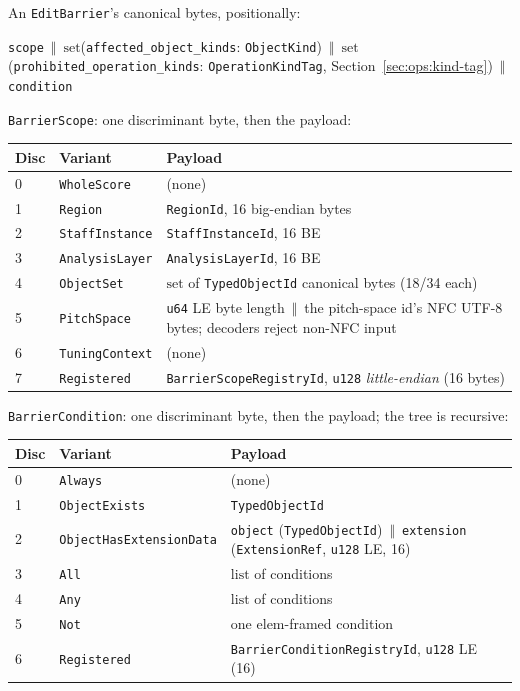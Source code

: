 \documentclass[11pt,letterpaper]{report}
\newcommand{\tablenums}[1]{{\addfontfeatures{Numbers={Lining,Tabular}}#1}}
\newcommand{\cat}{\ensuremath{\,\Vert\,}}
\begin{document}
An \texttt{EditBarrier}'s canonical bytes, positionally:

\begin{center}
\texttt{scope} \cat{} $\mathrm{set}$(\texttt{affected\_object\_kinds}:
\texttt{ObjectKind}) \cat{}
$\mathrm{set}$(\texttt{prohibited\_operation\_kinds}:
\texttt{OperationKindTag}, Section~\ref{sec:ops:kind-tag}) \cat{}
\texttt{condition}
\end{center}

\texttt{BarrierScope}: one discriminant byte, then the payload:

\begingroup\small
\begin{longtable}{p{0.35in} p{1.35in} p{3.8in}}
  \toprule
  \textbf{Disc} & \textbf{Variant} & \textbf{Payload} \\
  \midrule
  \endhead
  \tablenums{0} & \texttt{WholeScore} & (none) \\
  \tablenums{1} & \texttt{Region} & \texttt{RegionId}, 16 big-endian bytes \\
  \tablenums{2} & \texttt{StaffInstance} & \texttt{StaffInstanceId}, 16 BE \\
  \tablenums{3} & \texttt{AnalysisLayer} & \texttt{AnalysisLayerId}, 16 BE \\
  \tablenums{4} & \texttt{ObjectSet} & $\mathrm{set}$ of
    \texttt{TypedObjectId} canonical bytes (18/34 each) \\
  \tablenums{5} & \texttt{PitchSpace} & \texttt{u64} LE byte length \cat{}
    the pitch-space id's NFC UTF-8 bytes; decoders reject non-NFC input \\
  \tablenums{6} & \texttt{TuningContext} & (none) \\
  \tablenums{7} & \texttt{Registered} & \texttt{BarrierScopeRegistryId},
    \texttt{u128} \emph{little-endian} (16 bytes) \\
  \bottomrule
\end{longtable}
\endgroup

\texttt{BarrierCondition}: one discriminant byte, then the payload; the tree
is recursive:

\begingroup\small
\begin{longtable}{p{0.35in} p{1.85in} p{3.3in}}
  \toprule
  \textbf{Disc} & \textbf{Variant} & \textbf{Payload} \\
  \midrule
  \endhead
  \tablenums{0} & \texttt{Always} & (none) \\
  \tablenums{1} & \texttt{ObjectExists} & \texttt{TypedObjectId} \\
  \tablenums{2} & \texttt{ObjectHasExtensionData} & \texttt{object}
    (\texttt{TypedObjectId}) \cat{} \texttt{extension}
    (\texttt{ExtensionRef}, \texttt{u128} LE, 16) \\
  \tablenums{3} & \texttt{All} & $\mathrm{list}$ of conditions \\
  \tablenums{4} & \texttt{Any} & $\mathrm{list}$ of conditions \\
  \tablenums{5} & \texttt{Not} & one $\mathrm{elem}$-framed condition \\
  \tablenums{6} & \texttt{Registered} &
    \texttt{BarrierConditionRegistryId}, \texttt{u128} LE (16) \\
  \bottomrule
\end{longtable}
\endgroup
\end{document}
